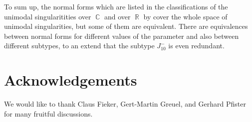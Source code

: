 \documentclass{amsproc}
\theoremstyle{definition}
\DeclareMathOperator{\R}{\mathbb{R}}
\DeclareMathOperator{\C}{\mathbb{C}}
\begin{document}
To sum up, the normal forms which are listed in the classifications of the
unimodal singularitities over $\C$ and over $\R$ by \citet{AVG1985} cover the
whole space of unimodal singularities, but some of them are equivalent. There
are equivalences between normal forms for different values of the parameter and
also between different subtypes, to an extend that the subtype $J_{10}^-$ is
even redundant.


\section{Acknowledgements}

We would like to thank Claus Fieker, Gert-Martin Greuel, and Gerhard Pfister
for many fruitful discussions.


\clearpage
\end{document}
